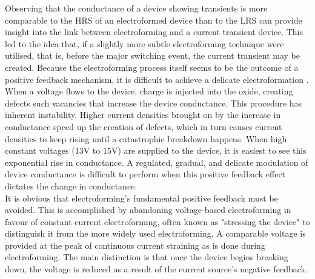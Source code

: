
\noindent Observing that the conductance of a device showing transients is more comparable to the HRS of an electroformed device than to the LRS can provide insight into the link between electroforming and a current transient device. This led to the idea that, if a slightly more subtle electroforming technique were utilised, that is, before the major switching event, the current transient may be created. Because the electroforming process itself seems to be the outcome of a positive feedback mechanism, it is difficult to achieve a delicate electroformation \cite{kozicki2016electrochemical}.\\

\noindent When a voltage flows to the device, charge is injected into the oxide, creating defects such vacancies that increase the device conductance. This procedure has inherent instability. Higher current densities brought on by the increase in conductance speed up the creation of defects, which in turn causes current densities to keep rising until a catastrophic breakdown happens. When high constant voltages (13V to 15V) are supplied to the device, it is easiest to see this exponential rise in conductance. A regulated, gradual, and delicate modulation of device conductance is difficult to perform when this positive feedback effect dictates the change in conductance.\\

\noindent It is obvious that electroforming's fundamental positive feedback must be avoided. This is accomplished by abandoning voltage-based electroforming in favour of constant current electroforming, often known as "stressing the device" to distinguish it from the more widely used electroforming. A comparable voltage is provided at the peak of continuous current straining as is done during electroforming. The main distinction is that once the device begins breaking down, the voltage is reduced as a result of the current source's negative feedback. \\

